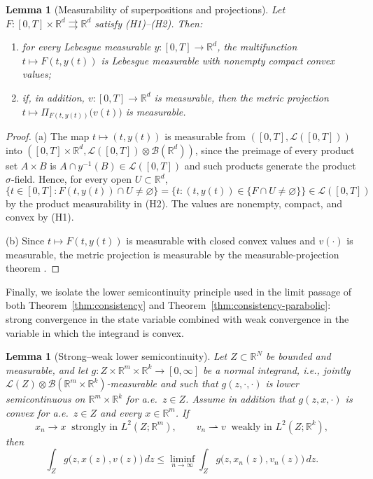\documentclass[11pt]{elsarticle}
\newtheorem{lemma}[theorem]{Lemma}
\theoremstyle{definition}
\theoremstyle{remark}
\numberwithin{equation}{section}
\begin{document}
	\begin{lemma}[Measurability of superpositions and projections]
		\label{lem:superposition-measurable}
		Let $F:[0,T]\times\mathbb{R}^d\rightrightarrows\mathbb{R}^d$ satisfy
		\textup{(H1)}--\textup{(H2)}. Then:
		\begin{enumerate}
			\item for every Lebesgue measurable
			$y:[0,T]\to\mathbb{R}^d$, the multifunction
			$t\mapsto F(t,y(t))$ is Lebesgue measurable with nonempty compact
			convex values;
			\item if, in addition, $v:[0,T]\to\mathbb{R}^d$ is measurable,
			then the metric projection
			$t\mapsto \Pi_{F(t,y(t))}\bigl(v(t)\bigr)$ is measurable.
		\end{enumerate}
	\end{lemma}
	
	\begin{proof}
		(a) The map $t\mapsto(t,y(t))$ is measurable from
		$([0,T],\mathcal{L}([0,T]))$ into
		$([0,T]\times\mathbb{R}^d,
		\mathcal{L}([0,T])\otimes\mathcal{B}(\mathbb{R}^d))$, since the
		preimage of every product set $A\times B$ is
		$A\cap y^{-1}(B)\in\mathcal{L}([0,T])$ and such products generate
		the product $\sigma$-field. Hence, for every open
		$U\subset\mathbb{R}^d$,
		\[
		\bigl\{t\in[0,T]:F(t,y(t))\cap U\neq\varnothing\bigr\}
		=
		\bigl\{t:(t,y(t))\in
		\{F\cap U\neq\varnothing\}\bigr\}
		\in\mathcal{L}([0,T])
		\]
		by the product measurability in \textup{(H2)}. The values are
		nonempty, compact, and convex by \textup{(H1)}.
		
		(b) Since $t\mapsto F(t,y(t))$ is measurable with closed convex
		values and $v(\cdot)$ is measurable, the metric projection is
		measurable by the measurable-projection theorem
		\cite[Theorem~8.2.11]{aubin_frankowska_2009}.
	\end{proof}
	
	Finally, we isolate the lower semicontinuity principle used in the
	limit passage of both Theorem~\ref{thm:consistency} and
	Theorem~\ref{thm:consistency-parabolic}: strong convergence in the
	state variable combined with weak convergence in the variable in which
	the integrand is convex.
	
	\begin{lemma}[Strong--weak lower semicontinuity]
		\label{lem:strong-weak-lsc}
		Let $Z\subset\mathbb{R}^N$ be bounded and measurable, and let
		$g:Z\times\mathbb{R}^m\times\mathbb{R}^k\to[0,\infty]$ be a normal
		integrand, i.e., jointly
		$\mathcal{L}(Z)\otimes
		\mathcal{B}(\mathbb{R}^m\times\mathbb{R}^k)$-measurable
		and such that $g(z,\cdot,\cdot)$ is lower semicontinuous on
		$\mathbb{R}^m\times\mathbb{R}^k$ for a.e.\ $z\in Z$. Assume in
		addition that $g(z,x,\cdot)$ is convex for a.e.\ $z\in Z$ and every
		$x\in\mathbb{R}^m$. If
		\[
		x_n\to x \ \text{ strongly in } L^2(Z;\mathbb{R}^m),
		\qquad
		v_n\rightharpoonup v \ \text{ weakly in } L^2(Z;\mathbb{R}^k),
		\]
		then
		\[
		\int_Z g\bigl(z,x(z),v(z)\bigr)\,dz
		\le
		\liminf_{n\to\infty}\int_Z g\bigl(z,x_n(z),v_n(z)\bigr)\,dz.
		\]
	\end{lemma}
	
\end{document}
